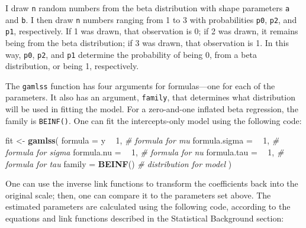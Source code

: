 \documentclass[english,man]{apa6}
\newenvironment{Shaded}{\begin{snugshade}}{\end{snugshade}}
\newcommand{\KeywordTok}[1]{\textcolor[rgb]{0.13,0.29,0.53}{\textbf{#1}}}
\newcommand{\DataTypeTok}[1]{\textcolor[rgb]{0.13,0.29,0.53}{#1}}
\newcommand{\DecValTok}[1]{\textcolor[rgb]{0.00,0.00,0.81}{#1}}
\newcommand{\StringTok}[1]{\textcolor[rgb]{0.31,0.60,0.02}{#1}}
\newcommand{\CommentTok}[1]{\textcolor[rgb]{0.56,0.35,0.01}{\textit{#1}}}
\newcommand{\OperatorTok}[1]{\textcolor[rgb]{0.81,0.36,0.00}{\textbf{#1}}}
\newcommand{\NormalTok}[1]{#1}
\theoremstyle{definition}
\theoremstyle{definition}
\theoremstyle{remark}
\begin{document}
I draw \texttt{n} random numbers from the beta distribution with shape
parameters \texttt{a} and \texttt{b}. I then draw \texttt{n} numbers
ranging from 1 to 3 with probabilities \texttt{p0}, \texttt{p2}, and
\texttt{p1}, respectively. If 1 was drawn, that observation is 0; if 2
was drawn, it remains being from the beta distribution; if 3 was drawn,
that observation is 1. In this way, \texttt{p0}, \texttt{p2}, and
\texttt{p1} determine the probability of being 0, from a beta
distribution, or being 1, respectively.

The \texttt{gamlss} function has four arguments for formulas---one for
each of the parameters. It also has an argument, \texttt{family}, that
determines what distribution will be used in fitting the model. For a
zero-and-one inflated beta regression, the family is \texttt{BEINF()}.
One can fit the intercepts-only model using the following code:

\begin{Shaded}
\begin{Highlighting}[]
\NormalTok{fit <-}\StringTok{ }\KeywordTok{gamlss}\NormalTok{(}
  \DataTypeTok{formula =}\NormalTok{ y }\OperatorTok{~}\StringTok{ }\DecValTok{1}\NormalTok{,     }\CommentTok{# formula for mu}
  \DataTypeTok{formula.sigma =} \OperatorTok{~}\StringTok{ }\DecValTok{1}\NormalTok{, }\CommentTok{# formula for sigma}
  \DataTypeTok{formula.nu =} \OperatorTok{~}\StringTok{ }\DecValTok{1}\NormalTok{,    }\CommentTok{# formula for nu}
  \DataTypeTok{formula.tau =} \OperatorTok{~}\StringTok{ }\DecValTok{1}\NormalTok{,   }\CommentTok{# formula for tau}
  \DataTypeTok{family =} \KeywordTok{BEINF}\NormalTok{()     }\CommentTok{# distribution for model}
\NormalTok{)}
\end{Highlighting}
\end{Shaded}

One can use the inverse link functions to transform the coefficients
back into the original scale; then, one can compare it to the parameters
set above. The estimated parameters are calculated using the following
code, according to the equations and link functions described in the
Statistical Background section:
\end{document}
